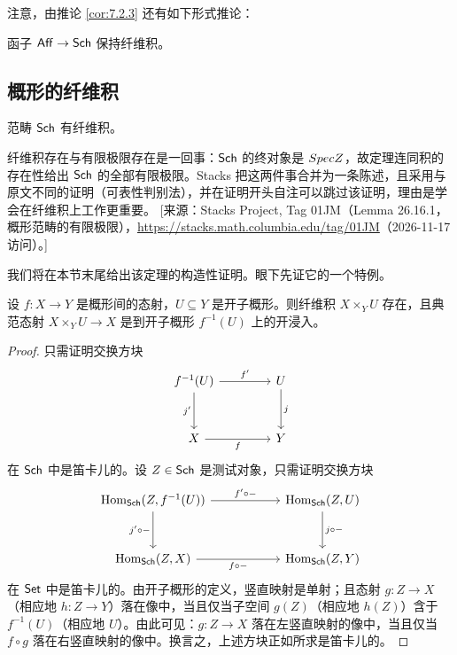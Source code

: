 注意，由推论 \ref{cor:7.2.3} 还有如下形式推论：

\begin{corollary}\label{cor:9.2.5}
函子 $\mathsf{Aff} \to \mathsf{Sch}$ 保持纤维积。
\end{corollary}

\subsection{概形的纤维积}\label{sec:9.3}

\begin{theorem}\label{thm:9.3.1}
范畴 $\mathsf{Sch}$ 有纤维积。
\end{theorem}

\begin{yizhu}
纤维积存在与有限极限存在是一回事：$\mathsf{Sch}$ 的终对象是 $Spec Z$，故定理连同积的存在性给出 $\mathsf{Sch}$ 的全部有限极限。Stacks 把这两件事合并为一条陈述，且采用与原文不同的证明（可表性判别法），并在证明开头自注可以跳过该证明，理由是学会在纤维积上工作更重要。
[来源：Stacks Project, Tag 01JM（Lemma 26.16.1，概形范畴的有限极限），\url{https://stacks.math.columbia.edu/tag/01JM}（2026-11-17 访问）。]
\end{yizhu}

我们将在本节末尾给出该定理的构造性证明。眼下先证它的一个特例。

\begin{lemma}\label{lem:9.3.2}
设 $f \colon X \to Y$ 是概形间的态射，$U \subseteq Y$ 是开子概形。则纤维积 $X \times_Y U$ 存在，且典范态射 $X \times_Y U \to X$ 是到开子概形 $f^{-1}(U)$ 上的开浸入。
\end{lemma}

\begin{proof}
只需证明交换方块
\[
\begin{tikzcd}[column sep=4.2em,row sep=3em]
f^{-1}(U) \arrow[r,"f'"] \arrow[d,"j'"'] & U \arrow[d,"j"]\\
X \arrow[r,"f"'] & Y
\end{tikzcd}
\]
在 $\mathsf{Sch}$ 中是笛卡儿的。设 $Z \in \mathsf{Sch}$ 是测试对象，只需证明交换方块
\[
\begin{tikzcd}[column sep=5.6em,row sep=3em]
\Hom_{\Sch}(Z,f^{-1}(U)) \arrow[r,"f'\circ-"] \arrow[d,"j'\circ-"'] & \Hom_{\Sch}(Z,U) \arrow[d,"j\circ-"]\\
\Hom_{\Sch}(Z,X) \arrow[r,"f\circ-"'] & \Hom_{\Sch}(Z,Y)
\end{tikzcd}
\]
在 $\mathsf{Set}$ 中是笛卡儿的。由开子概形的定义，竖直映射是单射；且态射 $g \colon Z \to X$（相应地 $h \colon Z \to Y$）落在像中，当且仅当子空间 $g(Z)$（相应地 $h(Z)$）含于 $f^{-1}(U)$（相应地 $U$）。由此可见：$g \colon Z \to X$ 落在左竖直映射的像中，当且仅当 $f \circ g$ 落在右竖直映射的像中。换言之，上述方块正如所求是笛卡儿的。
\end{proof}

